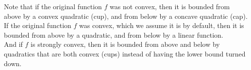 \documentclass[12pt]{article}
\begin{document}
Note that if the original function $f$ was
not convex, then it is bounded from 
above by a convex quadratic (cup),
and from below by a concave quadratic (cap). \\

If the original function $f$ was
convex, which we assume it is by default,
then it is bounded from above by a quadratic,
and from below by a linear function. \\

And if $f$ is strongly convex, then it is
bounded from above and below by quadratics
that are both convex (cups)
instead of having the lower bound turned down. \\

\newpage
\end{document}
